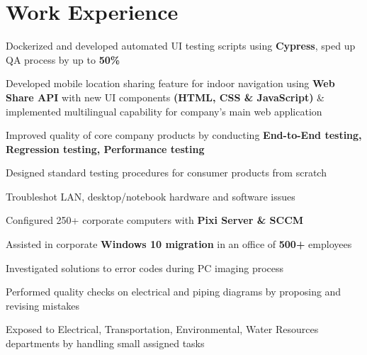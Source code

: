 \documentclass[]{morris-cv}
\begin{document}
\hfill
\begin{minipage}[t]{0.67\textwidth} 


\section{Work Experience}
\vspace{\topsep} %
\begin{tightemize}
    \item Dockerized and developed automated UI testing scripts using \textbf{Cypress},
    sped up QA process by up to \textbf{50\%}
    \item Developed mobile location sharing feature for indoor navigation using \textbf{Web Share API} with new UI components \textbf{(HTML, CSS \& JavaScript)} \& implemented multilingual capability for company's main web application
    \item Improved quality of core company products by conducting \textbf{End-to-End testing, Regression testing, Performance testing}
    \item Designed standard testing procedures for consumer products from scratch
\end{tightemize}
\sectionsep

\begin{tightemize}
    \item Troubleshot LAN, desktop/notebook hardware and software issues
    \item Configured 250+ corporate computers with \textbf{Pixi Server \& SCCM}
    \item Assisted in corporate \textbf{Windows 10 migration} in an office of \textbf{500+} employees
    \item Investigated solutions to error codes during PC imaging process
\end{tightemize}
\sectionsep

\begin{tightemize}
    \item Performed quality checks on electrical and piping diagrams by proposing and revising mistakes
    \item Exposed to Electrical, Transportation, Environmental, Water Resources departments by handling small assigned tasks
\end{tightemize}
\sectionsep


\end{minipage}
\end{document}
